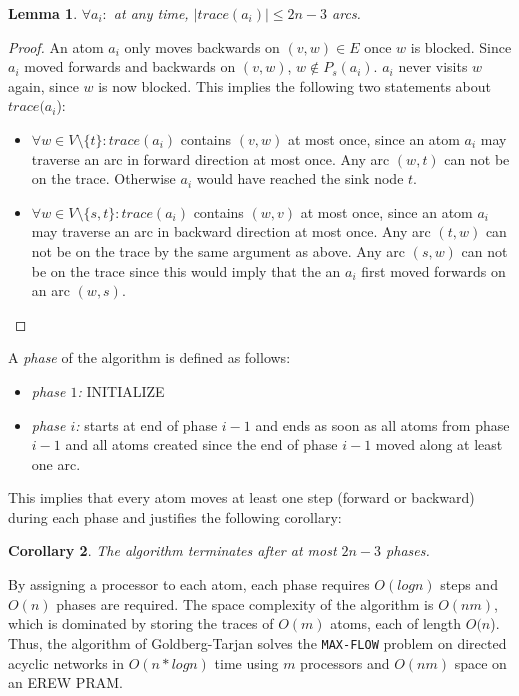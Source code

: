 \documentclass[a4paper,10pt, twocolumn]{article}
\newtheorem{lemma}{Lemma}
\newtheorem{corollary}[lemma]{Corollary}
\begin{document}
\begin{lemma}
$\forall a_i:$ at any time, $\lvert trace(a_i) \rvert \leq 2n-3$ arcs.
\end{lemma}
\begin{proof}
An atom $a_i$ only moves backwards on $(v,w) \in E$ once $w$ is blocked. Since $a_i$ moved forwards and backwards on $(v,w)$, $w \notin P_s(a_i)$. $a_i$ never visits $w$ again, since $w$ is now blocked. This implies the following two statements about $trace(a_i$):
\begin{itemize}
	\item $\forall w \in V \setminus \{t\}: trace(a_i)$ contains $(v,w)$ at most once, since an atom $a_i$ may traverse an arc in forward direction at most once. Any arc $(w,t)$ can not be on the trace. Otherwise $a_i$ would have reached the sink node $t$.
	\item $\forall w \in V \setminus \{s,t\}: trace(a_i)$ contains $(w,v)$ at most once, since an atom $a_i$ may traverse an arc in backward direction at most once. Any arc $(t,w)$ can not be on the trace by the same argument as above.  Any arc $(s,w)$ can not be on the trace since this would imply that the an $a_i$ first moved forwards on an arc $(w,s)$.
\end{itemize}
\end{proof}

A \emph{phase} of the algorithm is defined as follows:
\begin{itemize}
	\item \textit{phase $1$:} INITIALIZE
	\item \textit{phase $i$:} starts at end of phase $i-1$ and ends as soon as all atoms from phase $i-1$ and all atoms created since the end of phase $i-1$ moved along at least one arc.
\end{itemize}		
This implies that every atom moves at least one step (forward or backward) during each phase and justifies the following corollary:
\begin{corollary}
The algorithm terminates after at most $2n-3$ phases.
\end{corollary}

By assigning a processor to each atom, each phase requires $O(log n)$ steps and $O(n)$ phases are required. The space complexity of the algorithm is $O(nm)$, which is dominated by storing the traces of $O(m)$ atoms, each of length $O(n$). Thus, the algorithm of Goldberg-Tarjan solves the \lstinline|MAX-FLOW| problem on directed acyclic networks in $O(n*log n)$ time using $m$ processors and $O(nm)$ space on an EREW PRAM\cite{goldberg89}.
\end{document}
